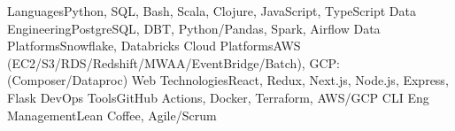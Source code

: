 \begin{additionals}
  \addional
    {Languages}{Python, SQL, Bash, Scala, Clojure, JavaScript, TypeScript}
  \addional
    {Data Engineering}{PostgreSQL, DBT, Python/Pandas, Spark, Airflow}
  \addional
    {Data Platforms}{Snowflake, Databricks}
  \addional
    {Cloud Platforms}{AWS (EC2/S3/RDS/Redshift/MWAA/EventBridge/Batch), GCP: (Composer/Dataproc)}
  \addional
    {Web Technologies}{React, Redux, Next.js, Node.js, Express, Flask}
  \addional
    {DevOps Tools}{GitHub Actions, Docker, Terraform, AWS/GCP CLI}
  \addional
    {Eng Management}{Lean Coffee, Agile/Scrum}
\end{additionals}